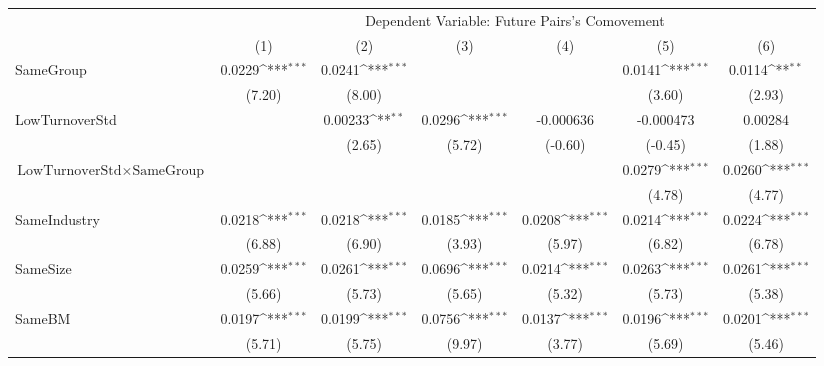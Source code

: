 {
\def\sym#1{\ifmmode^{#1}\else\(^{#1}\)\fi}
\begin{tabular}{l*{6}{c}}
\hline\hline
                &\multicolumn{6}{c}{Dependent Variable:  Future Pairs's Comovement}                                               \\\cmidrule(lr){2-7}
                &\multicolumn{1}{c}{(1)}         &\multicolumn{1}{c}{(2)}         &\multicolumn{1}{c}{(3)}         &\multicolumn{1}{c}{(4)}         &\multicolumn{1}{c}{(5)}         &\multicolumn{1}{c}{(6)}         \\
\hline
SameGroup       &   0.0229\sym{***}&   0.0241\sym{***}&                  &                  &   0.0141\sym{***}&   0.0114\sym{**} \\
                &   (7.20)         &   (8.00)         &                  &                  &   (3.60)         &   (2.93)         \\
[1em]
LowTurnoverStd  &                  &  0.00233\sym{**} &   0.0296\sym{***}&-0.000636         &-0.000473         &  0.00284         \\
                &                  &   (2.65)         &   (5.72)         &  (-0.60)         &  (-0.45)         &   (1.88)         \\
[1em]
$ {\text{LowTurnoverStd} } \times {\text{SameGroup} }  $ &                  &                  &                  &                  &   0.0279\sym{***}&   0.0260\sym{***}\\
                &                  &                  &                  &                  &   (4.78)         &   (4.77)         \\
[1em]
SameIndustry    &   0.0218\sym{***}&   0.0218\sym{***}&   0.0185\sym{***}&   0.0208\sym{***}&   0.0214\sym{***}&   0.0224\sym{***}\\
                &   (6.88)         &   (6.90)         &   (3.93)         &   (5.97)         &   (6.82)         &   (6.78)         \\
[1em]
SameSize        &   0.0259\sym{***}&   0.0261\sym{***}&   0.0696\sym{***}&   0.0214\sym{***}&   0.0263\sym{***}&   0.0261\sym{***}\\
                &   (5.66)         &   (5.73)         &   (5.65)         &   (5.32)         &   (5.73)         &   (5.38)         \\
[1em]
SameBM          &   0.0197\sym{***}&   0.0199\sym{***}&   0.0756\sym{***}&   0.0137\sym{***}&   0.0196\sym{***}&   0.0201\sym{***}\\
                &   (5.71)         &   (5.75)         &   (9.97)         &   (3.77)         &   (5.69)         &   (5.46)         \\

\end{tabular}}
